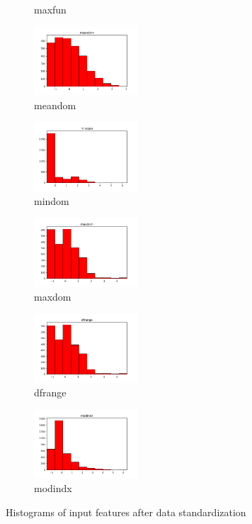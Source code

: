 \documentclass[a4paper]{article}
\begin{document}
\begin{figure}
\begin{subfigure}{0.32\textwidth}
        \caption{maxfun}
        \label{fig:sub_std_14}
    \end{subfigure}\hfill
    \begin{subfigure}{0.32\textwidth}
        \centering
        \includegraphics[width=3.85cm]{std_14_meandom}
        \caption{meandom}
        \label{fig:sub_std_15}
    \end{subfigure}\hfill
    \begin{subfigure}{0.32\textwidth}
        \centering
        \includegraphics[width=3.85cm]{std_15_mindom}
        \caption{mindom}
        \label{fig:sub_std_16}
    \end{subfigure}\hfill
    \begin{subfigure}{0.32\textwidth}
        \centering
        \includegraphics[width=3.85cm]{std_16_maxdom}
        \caption{maxdom}
        \label{fig:sub_std_17}
    \end{subfigure}\hfill
    \begin{subfigure}{0.32\textwidth}
        \centering
        \includegraphics[width=3.85cm]{std_17_dfrange}
        \caption{dfrange}
        \label{fig:sub_std_18}
    \end{subfigure}\hfill
    \begin{subfigure}{0.32\textwidth}
        \centering
        \includegraphics[width=3.85cm]{std_18_modindx}
        \caption{modindx}
        \label{fig:sub_std_19}
    \end{subfigure}
    \caption{Histograms of input features after data standardization}
    \label{fig:pre-ex1-std_histograms}
\end{figure}
\end{document}
